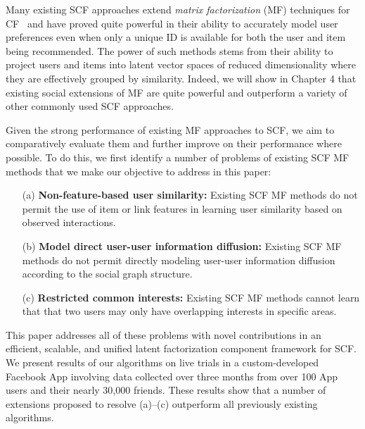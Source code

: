 Many existing SCF approaches extend \emph{matrix factorization} (MF)
techniques for CF~\cite{pmf} and have proved quite powerful in their ability to
accurately model user preferences even when only a unique ID is
available for both the user and item being recommended.  The power of
such methods stems from their ability to project users and items into
latent vector spaces of reduced dimensionality where they are 
effectively grouped by similarity.  Indeed, we will show in
Chapter 4 that existing social extensions of MF are
quite powerful and outperform a variety of other commonly used SCF
approaches.

Given the strong performance of existing MF approaches to SCF, we aim
to comparatively evaluate them and further improve on their
performance where possible.  To do this, we first identify a number of
problems of existing SCF MF methods that we make our objective to
address in this paper:
\begin{enumerate}
\item[(a)] {\bf Non-feature-based user similarity:} Existing SCF MF
methods do not permit the use of item or link features in learning
user similarity based on observed interactions.
\item[(b)] {\bf Model direct user-user information diffusion:}
Existing SCF MF methods do not permit directly modeling user-user
information diffusion according to the social graph structure.
\item[(c)] {\bf Restricted common interests:} Existing SCF MF methods
cannot learn that that two users may only have overlapping interests
in specific areas.
\end{enumerate}

This paper addresses all of these problems with novel contributions in
an efficient, scalable, and unified latent factorization component
framework for SCF.  We present results of our algorithms on live
trials in a custom-developed Facebook App involving data collected
over three months from over 100 App users and their nearly 30,000
friends.  These results show that a number of extensions proposed to
resolve (a)--(c) outperform all previously existing algorithms.

